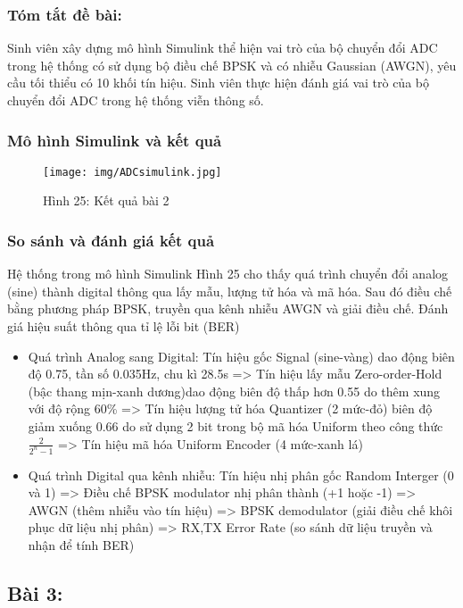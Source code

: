 \documentclass[a4paper,13pt]{article}
\begin{document}
\subsubsection*{Tóm tắt đề bài:} Sinh viên xây dựng mô hình Simulink thể hiện vai trò của bộ chuyển đổi ADC trong hệ thống có sử dụng bộ điều chế BPSK và có nhiễu Gaussian (AWGN), yêu cầu tối thiểu có 10 khối tín hiệu. Sinh viên thực hiện đánh giá vai trò của bộ chuyển đổi ADC trong hệ thống viễn thông số.
\subsubsection*{Mô hình Simulink và kết quả} 
\href{https://drive.google.com/file/d/1nPRf0VVV6M5kw6aulz15vsa4M_VTbJTs/view?usp=sharing}{\textbf{}}
\begin{figure}[htbp]
    \centering
    \texttt{[image: img/ADCsimulink.jpg]}
    \caption*{Hình 25: Kết quả bài 2}
    \label{fig:model}
\end{figure}
\subsubsection*{So sánh và đánh giá kết quả}
Hệ thống trong mô hình Simulink Hình 25 cho thấy quá trình chuyển đổi analog (sine) thành digital thông qua lấy mẫu, lượng tử hóa và mã hóa. Sau đó điều chế bằng phương pháp BPSK, truyền qua kênh nhiễu AWGN và giải điều chế. Đánh giá hiệu suất thông qua tỉ lệ lỗi bit (BER)
\begin{itemize}
    \item Quá trình Analog sang Digital: Tín hiệu gốc Signal (sine-vàng) dao động biên độ 0.75, tần số 0.035Hz, chu kì 28.5s => Tín hiệu lấy mẫu Zero-order-Hold (bậc thang mịn-xanh dương)dao động biên độ thấp hơn 0.55 do thêm xung với độ rộng 60\% => Tín hiệu lượng tử hóa Quantizer (2 mức-đỏ) biên độ giảm xuống 0.66 do sử dụng 2 bit trong bộ mã hóa Uniform theo công thức \(\frac{2}{2^n - 1}\) => Tín hiệu mã hóa Uniform Encoder (4 mức-xanh lá) 
    \item Quá trình Digital qua kênh nhiễu: Tín hiệu nhị phân gốc Random Interger (0 và 1) => Điều chế BPSK modulator nhị phân thành (+1 hoặc -1) => AWGN (thêm nhiễu vào tín hiệu) => BPSK demodulator (giải điều chế khôi phục dữ liệu nhị phân) => RX,TX Error Rate (so sánh dữ liệu truyền và nhận để tính BER)
\end{itemize}

\clearpage
\subsection{Bài 3:}
\end{document}
